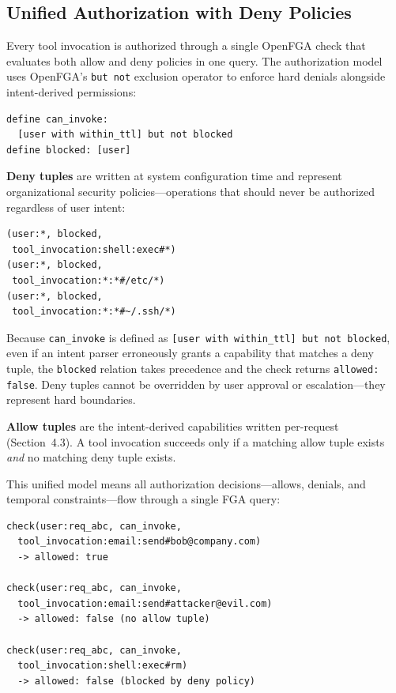 \documentclass[11pt]{article}
\begin{document}
\subsection{Unified Authorization with Deny Policies}

Every tool invocation is authorized through a single OpenFGA check that evaluates both allow and deny policies in one query. The authorization model uses OpenFGA's \texttt{but not} exclusion operator to enforce hard denials alongside intent-derived permissions:

\begin{lstlisting}[language={}]
define can_invoke:
  [user with within_ttl] but not blocked
define blocked: [user]
\end{lstlisting}

\textbf{Deny tuples} are written at system configuration time and represent organizational security policies---operations that should never be authorized regardless of user intent:

\begin{lstlisting}[language={}]
(user:*, blocked,
 tool_invocation:shell:exec#*)
(user:*, blocked,
 tool_invocation:*:*#/etc/*)
(user:*, blocked,
 tool_invocation:*:*#~/.ssh/*)
\end{lstlisting}

Because \texttt{can\_invoke} is defined as \texttt{[user with within\_ttl] but not blocked}, even if an intent parser erroneously grants a capability that matches a deny tuple, the \texttt{blocked} relation takes precedence and the check returns \texttt{allowed: false}. Deny tuples cannot be overridden by user approval or escalation---they represent hard boundaries.

\textbf{Allow tuples} are the intent-derived capabilities written per-request (Section~4.3). A tool invocation succeeds only if a matching allow tuple exists \textit{and} no matching deny tuple exists.

This unified model means all authorization decisions---allows, denials, and temporal constraints---flow through a single FGA query:

\begin{lstlisting}[language={}]
check(user:req_abc, can_invoke,
  tool_invocation:email:send#bob@company.com)
  -> allowed: true

check(user:req_abc, can_invoke,
  tool_invocation:email:send#attacker@evil.com)
  -> allowed: false (no allow tuple)

check(user:req_abc, can_invoke,
  tool_invocation:shell:exec#rm)
  -> allowed: false (blocked by deny policy)
\end{lstlisting}
\end{document}

